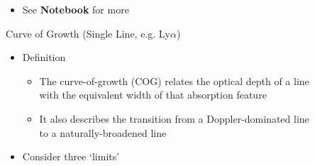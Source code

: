 \documentclass[12pt,letterpaper]{article}
\begin{document}
\begin{Aenumerate}
\begin{itemize}
  \item See {\bf Notebook} for more
 \end{itemize}


{\bf \item Curve of Growth (Single Line, e.g. Ly$\alpha$)}
 \begin{itemize}
 \item Definition
	\begin{itemize}
	\item The curve-of-growth (COG) relates the optical depth of a line \\
	with the equivalent width of that absorption feature
	\item It also describes the transition from a Doppler-dominated line \\
	to a naturally-broadened line
	\end{itemize}

 \item Consider three `limits'


\end{itemize}
\end{Aenumerate}
\end{document}
